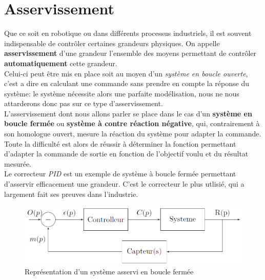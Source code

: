 \chapter{Asservissement}
    Que ce soit en robotique ou dans différents processus industriels, il est souvent indispensable de contrôler certaines grandeurs physiques.
    On appelle \textbf{asservissement} d'une grandeur l'ensemble des moyens permettant de contrôler \textbf{automatiquement} cette grandeur.\\
    Celui-ci peut être mis en place soit au moyen d'un \textit{système en boucle ouverte}, c'est a dire en calculant une commande sans prendre en compte la réponse du système: le système nécessite alors une parfaite modélisation, nous ne nous attarderons donc pas sur ce type d'asservissement.\\
    L'asservissement dont nous allons parler se place dans le cas d'un \textbf{système en boucle fermée} ou \textbf{système à contre réaction négative}, qui, contrairement à son homologue ouvert, mesure la réaction du système pour adapter la commande. Toute la difficulté est alors de réussir à déterminer la fonction permettant d'adapter la commande de sortie en fonction de l'objectif voulu et du résultat mesurée.\\
    Le correcteur \textit{PID} est un exemple de système à boucle fermée permettant d'asservir efficacement une grandeur. C'est le correcteur le plus utlisié, qui a largement fait ses preuves dans l'industrie.
    \begin{figure}[h]
        \centering
        \includegraphics[scale=0.35]{assets/ASSERV.png}
        \caption{Représentation d'un système asservi en boucle fermée}
    \end{figure}


    \newpage
